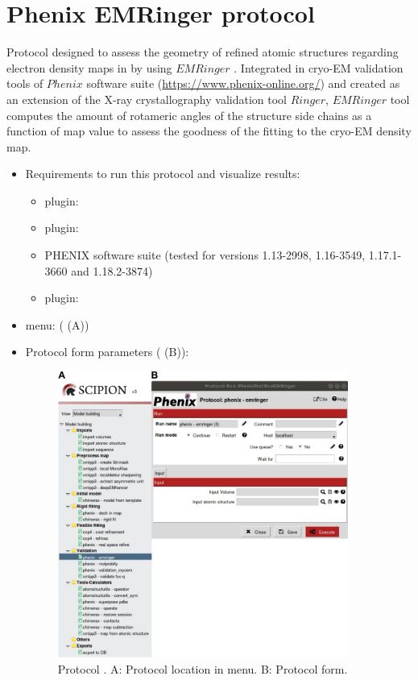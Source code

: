 \section{Phenix EMRinger protocol}
\label{app:emRingerProtocol}%
Protocol designed to assess the geometry of refined atomic structures regarding electron density maps in \scipion by using $EMRinger$ \citep{barad2015}. Integrated in cryo-EM validation tools of $Phenix$ software suite (\url{https://www.phenix-online.org/}) and created as an extension of the X-ray crystallography validation tool $Ringer$, $EMRinger$ tool computes the amount of rotameric angles of the structure side chains as a function of map value to assess the goodness of the fitting to the cryo-EM density map.

\begin{itemize}
 \item Requirements to run this protocol and visualize results:
    \begin{itemize}
        \item \scipion plugin: 
        \item \scipion plugin: 
        \item PHENIX software suite (tested for versions 1.13-2998, 1.16-3549, 1.17.1-3660 and 1.18.2-3874)
        \item \scipion plugin: 
    \end{itemize}
 \item \scipion menu:
   ( (A))
  
 \item Protocol form parameters ( (B)):
  
    \begin{figure}[H]
     \centering 
     \captionsetup{width=.9\linewidth} 
     \includegraphics[width=0.90\textwidth]{Images_appendix/Fig139.pdf}
     \caption{Protocol . A: Protocol location in \scipion menu. B: Protocol form.}
     \label{fig:app_protocol_emringer_1}
    \end{figure}


\end{itemize}

